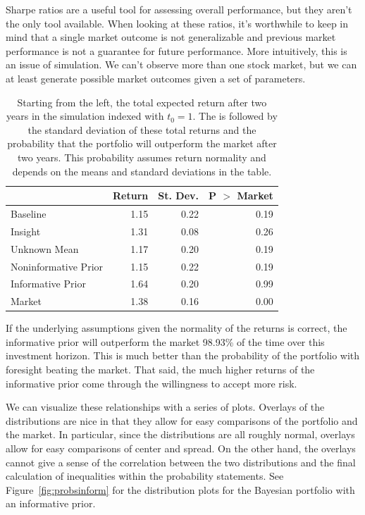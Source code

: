 \documentclass[a4paper]{article}\usepackage[]{graphicx}\usepackage[]{color}
\begin{document}
Sharpe ratios are a useful tool for assessing overall performance, but they aren't the only tool available. When looking at these ratios, it's worthwhile to keep in mind that a single market outcome is not generalizable and previous market performance is not a guarantee for future performance. More intuitively, this is an issue of simulation. We can't observe more than one stock market, but we can at least generate possible market outcomes given a set of parameters.

\begin{table}
    \centering
\begin{tabular}{lrrr}
  \hline
 & Return & St. Dev. & P $>$ Market \\ 
  \hline
Baseline & 1.15 & 0.22 & 0.19 \\ 
  Insight & 1.31 & 0.08 & 0.26 \\ 
  Unknown Mean & 1.17 & 0.20 & 0.19 \\ 
  Noninformative Prior & 1.15 & 0.22 & 0.19 \\ 
  Informative Prior & 1.64 & 0.20 & 0.99 \\ 
  Market & 1.38 & 0.16 & 0.00 \\ 
   \hline
\end{tabular}
    \caption{Starting from the left, the total expected return after two years in the simulation indexed with $t_0 = 1$. The is followed by the standard deviation of these total returns and the probability that the portfolio will outperform the market after two years. This probability assumes return normality and depends on the means and standard deviations in the table.}
    \label{tab:simulations}
\end{table}

If the underlying assumptions given the normality of the returns is correct, the informative prior will outperform the market 98.93\% of the time over this investment horizon. This is much better than the probability of the portfolio with foresight beating the market. That said, the much higher returns of the informative prior come through the willingness to accept more risk.

We can visualize these relationships with a series of plots. Overlays of the distributions are nice in that they allow for easy comparisons of the portfolio and the market. In particular, since the distributions are all roughly normal, overlays allow for easy comparisons of center and spread. On the other hand, the overlays cannot give a sense of the correlation between the two distributions and the final calculation of inequalities within the probability statements. See Figure~\ref{fig:probsinform} for the distribution plots for the Bayesian portfolio with an informative prior.
\end{document}

